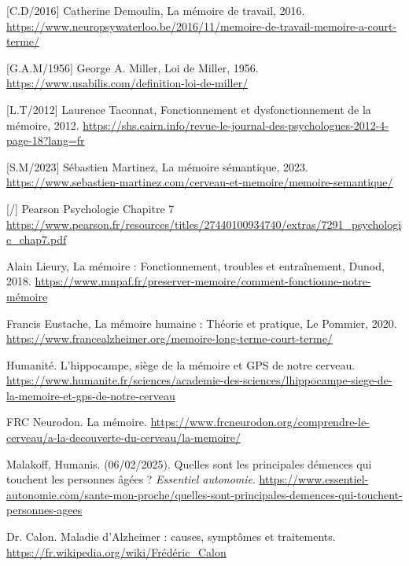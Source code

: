 \documentclass[11pt,a4paper]{report}
\begin{document}
\begin{thebibliography}{9}

        [C.D/2016] Catherine Demoulin, La mémoire de travail, 2016. \break
        \url{https://www.neuropsywaterloo.be/2016/11/memoire-de-travail-memoire-a-court-terme/}

        [G.A.M/1956] George A. Miller, Loi de Miller, 1956. \break
        \url{https://www.usabilis.com/definition-loi-de-miller/}
    
        [L.T/2012] Laurence Taconnat, Fonctionnement et dysfonctionnement de la mémoire, 2012. \break
        \url{https://shs.cairn.info/revue-le-journal-des-psychologues-2012-4-page-18?lang=fr}

        [S.M/2023] Sébastien Martinez, La mémoire sémantique, 2023. \break
        \url{https://www.sebastien-martinez.com/cerveau-et-memoire/memoire-semantique/}
    
        [/] Pearson Psychologie Chapitre 7 \break
        \url{https://www.pearson.fr/resources/titles/27440100934740/extras/7291_psychologie_chap7.pdf}

        Alain Lieury, La mémoire : Fonctionnement, troubles et entraînement, Dunod, 2018.
        \url{https://www.mnpaf.fr/preserver-memoire/comment-fonctionne-notre-mémoire}

        Francis Eustache, La mémoire humaine : Théorie et pratique, Le Pommier, 2020. \break
        \url{https://www.francealzheimer.org/memoire-long-terme-court-terme/}
        
        Humanité. L'hippocampe, siège de la mémoire et GPS de notre cerveau. \break
        \url{https://www.humanite.fr/sciences/academie-des-sciences/lhippocampe-siege-de-la-memoire-et-gps-de-notre-cerveau}
        
        FRC Neurodon. La mémoire. \break
        \url{https://www.frcneurodon.org/comprendre-le-cerveau/a-la-decouverte-du-cerveau/la-memoire/}

        Malakoff, Humanis. (06/02/2025). Quelles sont les principales démences qui touchent les personnes âgées ? \textit{Essentiel autonomie}. \break
        \url{https://www.essentiel-autonomie.com/sante-mon-proche/quelles-sont-principales-demences-qui-touchent-personnes-agees}

        Dr. Calon. Maladie d'Alzheimer : causes, symptômes et traitements. \break
        \url{https://fr.wikipedia.org/wiki/Frédéric_Calon}
    

\end{thebibliography}
\end{document}

